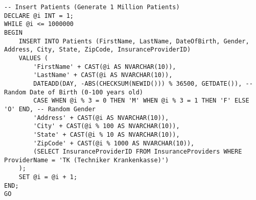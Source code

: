 \begin{lstlisting}[style=sqlstyle, caption={Script for Inserting Data}, label=lst:inserting_data]
-- Insert Patients (Generate 1 Million Patients)
DECLARE @i INT = 1;
WHILE @i <= 1000000
BEGIN
    INSERT INTO Patients (FirstName, LastName, DateOfBirth, Gender, Address, City, State, ZipCode, InsuranceProviderID)
    VALUES (
        'FirstName' + CAST(@i AS NVARCHAR(10)),
        'LastName' + CAST(@i AS NVARCHAR(10)),
        DATEADD(DAY, -ABS(CHECKSUM(NEWID())) % 36500, GETDATE()), -- Random Date of Birth (0-100 years old)
        CASE WHEN @i % 3 = 0 THEN 'M' WHEN @i % 3 = 1 THEN 'F' ELSE 'O' END, -- Random Gender
        'Address' + CAST(@i AS NVARCHAR(10)),
        'City' + CAST(@i % 100 AS NVARCHAR(10)),
        'State' + CAST(@i % 10 AS NVARCHAR(10)),
        'ZipCode' + CAST(@i % 1000 AS NVARCHAR(10)),
        (SELECT InsuranceProviderID FROM InsuranceProviders WHERE ProviderName = 'TK (Techniker Krankenkasse)')
    );
    SET @i = @i + 1;
END;
GO

\end{lstlisting}